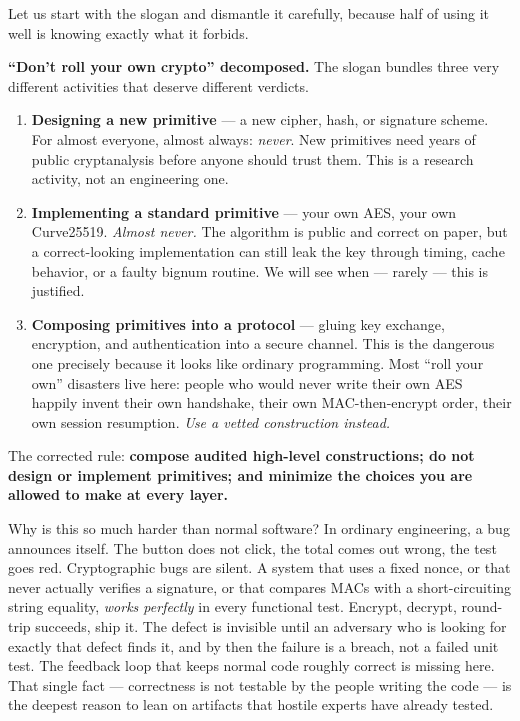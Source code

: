 Let us start with the slogan and dismantle it carefully, because half of using it
well is knowing exactly what it forbids.

\begin{focusbox}
\textbf{``Don't roll your own crypto'' decomposed.} The slogan bundles three very
different activities that deserve different verdicts.
\begin{enumerate}
  \item \textbf{Designing a new primitive} --- a new cipher, hash, or signature
  scheme. For almost everyone, almost always: \emph{never}. New primitives need
  years of public cryptanalysis before anyone should trust them. This is a
  research activity, not an engineering one.
  \item \textbf{Implementing a standard primitive} --- your own AES, your own
  Curve25519. \emph{Almost never.} The algorithm is public and correct on paper,
  but a correct-looking implementation can still leak the key through timing,
  cache behavior, or a faulty bignum routine. We will see when --- rarely --- this
  is justified.
  \item \textbf{Composing primitives into a protocol} --- gluing key exchange,
  encryption, and authentication into a secure channel. This is the dangerous one
  precisely because it looks like ordinary programming. Most ``roll your own''
  disasters live here: people who would never write their own AES happily invent
  their own handshake, their own MAC-then-encrypt order, their own session
  resumption. \emph{Use a vetted construction instead.}
\end{enumerate}
The corrected rule: \textbf{compose audited high-level constructions; do not
design or implement primitives; and minimize the choices you are allowed to make
at every layer.}
\end{focusbox}

Why is this so much harder than normal software? In ordinary engineering, a bug
announces itself. The button does not click, the total comes out wrong, the test
goes red. Cryptographic bugs are silent. A system that uses a fixed nonce, or that
never actually verifies a signature, or that compares MACs with a short-circuiting
string equality, \emph{works perfectly} in every functional test. Encrypt,
decrypt, round-trip succeeds, ship it. The defect is invisible until an adversary
who is looking for exactly that defect finds it, and by then the failure is a
breach, not a failed unit test. The feedback loop that keeps normal code roughly
correct is missing here. That single fact --- correctness is not testable by the
people writing the code --- is the deepest reason to lean on artifacts that
hostile experts have already tested.

